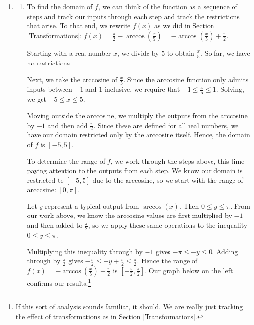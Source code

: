 \documentclass{ximera}
\begin{document}
\begin{example}
\begin{explanation}
\begin{enumerate}
\begin{enumerate}
\begin{image}
\end{image}

\end{enumerate}

\item \begin{enumerate}

\item  To find the domain of $f$, we can think of the function as a sequence of steps and track our inputs through each step and track the restrictions that arise.  To that end, we rewrite $f(x)$ as we did in Section \ref{Transformations}:  $f(x) = \frac{\pi}{2} - \arccos\left(\frac{x}{5}\right) = - \arccos\left(\frac{x}{5}\right) + \frac{\pi}{2}$.

 

Starting with a real number $x$, we divide by $5$ to obtain $\frac{x}{5}$.  So far, we have no restrictions.  

 

Next, we take the arccosine of $\frac{x}{5}$.  Since the arccosine function only admits inputs between $-1$ and $1$ inclusive, we require that  $-1 \leq \frac{x}{5} \leq 1$. Solving, we get  $-5 \leq x \leq 5$.

 

Moving outside the arccosine, we multiply the outputs from the arccosine by $-1$ and then add $\frac{\pi}{2}$.  Since these are defined for all real numbers, we have our domain restricted only by the arccosine itself.  Hence, the domain of $f$ is $[-5,5]$.

 

To determine the range of $f$, we work through the steps above, this time paying attention to the outputs from each step.  We know our domain is restricted to $[-5,5]$ due to the arccosine, so we start with the range of arccosine:  $[0, \pi]$.

 

Let $y$ represent a typical  output from $\arccos(x)$.  Then $0 \leq y \leq \pi$.  From our work above, we know the arccosine values are first multiplied by $-1$ and then added to $\frac{\pi}{2}$, so we apply these same operations to the inequality $0 \leq y \leq \pi$.

 

Multiplying this inequality through by $-1$ gives $-\pi \leq -y \leq 0$.  Adding through by $\frac{\pi}{2}$ gives $-\frac{\pi}{2} \leq -y + \frac{\pi}{2} \leq \frac{\pi}{2}$.  Hence the range of  $f(x)  = - \arccos\left(\frac{x}{5}\right) + \frac{\pi}{2}$ is $\left[-\frac{\pi}{2}, \frac{\pi}{2}\right]$. Our graph below on the left confirms our results.\footnote{If this sort of analysis sounds familiar, it should. We are really just tracking the effect of transformations as in Section \ref{Transformations}.}


\end{enumerate}
\end{enumerate}
\end{explanation}
\end{example}
\end{document}
